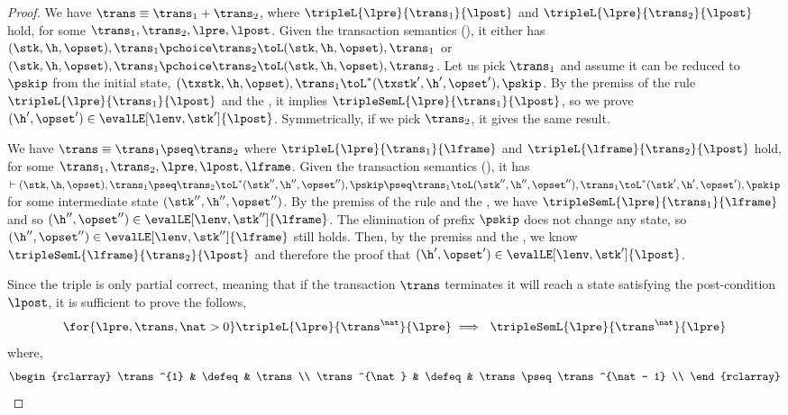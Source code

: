 \begin{proof}

We have  \(\trans \equiv \trans_{1} + \trans_{2} \), where \( \tripleL{\lpre}{\trans_{1}}{\lpost} \) and \( \tripleL{\lpre}{\trans_{2}}{\lpost} \) hold, for some \( \trans_{1}, \trans_{2}, \lpre, \lpost \).
Given the transaction semantics (), it either has \( ( \stk, \h, \opset ), \trans_{1} \pchoice \trans_{2} \toL ( \stk, \h, \opset ), \trans_{1} \) or  \( ( \stk, \h, \opset ), \trans_{1} \pchoice \trans_{2} \toL ( \stk, \h, \opset ), \trans_{2} \).
Let us pick \( \trans_{1} \) and  assume it can be reduced to \( \pskip \) from the initial state, \ie \( ( \txstk, \h, \opset ), \trans_{1}  \toL^{*} ( \txstk', \h', \opset' ), \pskip \).
By the premiss of the rule \( \tripleL{\lpre}{\trans_{1}}{\lpost} \) and the \ih, it implies \( \tripleSemL{\lpre}{\trans_{1}}{\lpost} \), so we prove \( (\h', \opset') \in \evalLE[\lenv, \stk']{\lpost} \).
Symmetrically, if we pick \( \trans_{2} \), it gives the same result.


We have \( \trans \equiv \trans_{1} \pseq \trans_{2} \) where \( \tripleL{\lpre}{\trans_{1}}{\lframe} \) and \( \tripleL{\lframe}{\trans_{2}}{\lpost} \) hold, for some \( \trans_{1}, \trans_{2}, \lpre, \lpost, \lframe \).
Given the transaction semantics (), it has \( \vdash ( \stk, \h, \opset ), \trans_{1} \pseq \trans_{2} \toL^{*} ( \stk'', \h'', \opset'' ), \pskip \pseq \trans_{1} \toL ( \stk'', \h'', \opset'' ), \trans_{1} \toL^{*} ( \stk', \h', \opset' ), \pskip \) for some intermediate state \( (\stk'', \h'', \opset'') \).
By the premiss of the rule and the \ih, we have \( \tripleSemL{\lpre}{\trans_{1}}{\lframe} \) and so \( (\h'', \opset'') \in \evalLE[\lenv, \stk'']{\lframe} \).
The elimination of prefix \( \pskip\) does not change any state, so \( (\h'', \opset'') \in \evalLE[\lenv, \stk'']{\lframe} \) still holds.
Then, by the premiss and the \ih, we know \( \tripleSemL{\lframe}{\trans_{2}}{\lpost} \) and therefore the proof that \( (\h', \opset') \in \evalLE[\lenv, \stk']{\lpost} \).


Since the triple is only partial correct, meaning that if the transaction \( \trans \) terminates it will reach a state satisfying the post-condition \( \lpost \), it is sufficient to prove the follows,
\[
    \for{\lpre, \trans, \nat > 0} \tripleL{\lpre}{\trans^{\nat}}{\lpre} \implies \ \tripleSemL{\lpre}{\trans^{\nat}}{\lpre} 
\]
where,
\[
\begin{rclarray}
    \trans^{1} & \defeq  & \trans \\
    \trans^{\nat} & \defeq  & \trans \pseq \trans^{\nat - 1} \\
\end{rclarray}
\]


\end{proof}
